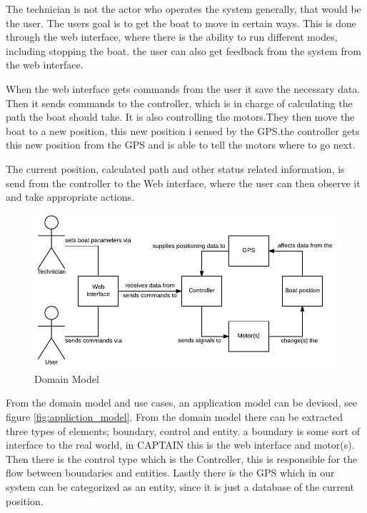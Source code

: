 The technician is not the actor who operates the system generally, that would be the user. The users goal is to get the boat to move in certain ways. This is done through the web interface, where there is the ability to run different modes, including stopping the boat. the user can also get feedback from the system from the web interface.

When the web interface gets commands from the user it save the necessary data. Then it sends commands to the controller, which is in charge of calculating the path the boat should take. It is also controlling the motors.They then move the boat to a new position, this new position i sensed by the GPS.the controller gets this new position from the GPS and is able to tell the motors where to go next.

The current position, calculated path and other status related information, is send from the controller to the Web interface, where the user can then observe it and take appropriate actions.

\begin{figure}[h]
	\centering
	\includegraphics[width=1\linewidth]{Images/System_architecture/Domain_Model}	
	\caption{Domain Model}
	\label{fig:domain_model}
\end{figure}

From the domain model and use cases, an application model can be devised, see figure \ref{fig:appliction_model}. From the domain model there can be extracted three types of elements; boundary, control and entity.
a boundary is some sort of interface to the real world, in CAPTAIN this is the web interface and motor(s). Then there is the control type which is the Controller, this is responsible for the flow between boundaries and entities. Lastly there is the GPS which in our system can be categorized as an entity, since it is just a database of the current position.

